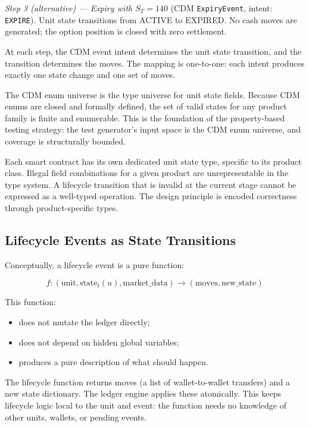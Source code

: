\documentclass[11pt,a4paper]{article}
\begin{document}
\noindent\textit{Step 3 (alternative) --- Expiry with $S_T = 140$} (CDM \texttt{ExpiryEvent}, intent: \texttt{EXPIRE}). Unit state transitions from ACTIVE to EXPIRED. No cash moves are generated; the option position is closed with zero settlement.

\noindent At each step, the CDM event intent determines the unit state transition, and the transition determines the moves. The mapping is one-to-one: each intent produces exactly one state change and one set of moves.

\medskip

The CDM enum universe is the type universe for unit state fields. Because CDM enums are closed and formally defined, the set of valid states for any product family is finite and enumerable. This is the foundation of the property-based testing strategy: the test generator's input space is the CDM enum universe, and coverage is structurally bounded.

Each smart contract has its own dedicated unit state type, specific to its product class. Illegal field combinations for a given product are unrepresentable in the type system. A lifecycle transition that is invalid at the current stage cannot be expressed as a well-typed operation. The design principle is encoded correctness through product-specific types.

\subsection{Lifecycle Events as State Transitions}

Conceptually, a lifecycle event is a pure function:

\[
f : (\text{unit}, \text{state}_t(u), \text{market\_data}) \to (\text{moves}, \text{new\_state})
\]

This function:

\begin{itemize}[nosep]
\item does not mutate the ledger directly;
\item does not depend on hidden global variables;
\item produces a pure description of what should happen.
\end{itemize}

The lifecycle function returns moves (a list of wallet-to-wallet transfers) and a new state dictionary. The ledger engine applies these atomically. This keeps lifecycle logic local to the unit and event: the function needs no knowledge of other units, wallets, or pending events.
\end{document}
